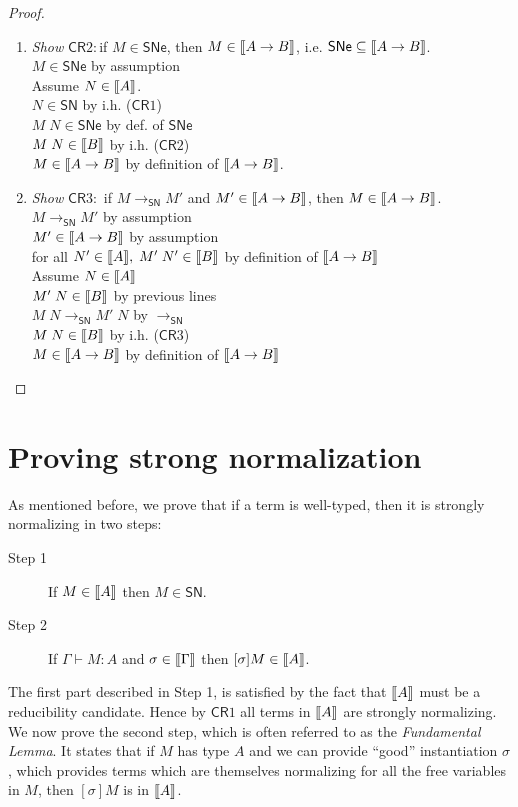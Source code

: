 \documentclass{article}
\newcommand{\SN}{\mathsf{SN}}
\newcommand{\SNe}{\mathsf{SNe}}
\newcommand{\CR}{\mathsf{CR}}
\newcommand{\redSN}{\longrightarrow_\SN}
\def\lv{\mathopen{{[\kern-0.14em[}}}    %
\def\rv{\mathclose{{]\kern-0.14em]}}}   %
\newcommand{\den}[1]{\lv #1 \rv}
\begin{document}
\begin{proof}
\begin{enumerate}
\item \textit{Show} $\CR2:$if $M \in \SNe$, then $M\in \den{A \arrow B}$, i.e. $\SNe \subseteq \den{A \arrow B}$. \\[0.5em]
%
$M \in \SNe$ \hfill by assumption\\
Assume $N \in \den{A}$.  \\
$N \in \SN$ \hfill by i.h. ($\CR1$) \\
$M\;N \in \SNe$ \hfill by def. of $\SNe$ \\
$M\;N \in \den{B}$ \hfill by i.h. ($\CR2$)\\
$M \in \den{A \arrow B}$ \hfill by definition of $\den{A \arrow B}$.
\\[1em]
\item \textit{Show} $\CR3:$ if $M \redSN M'$ and $M' \in \den{A \arrow B}$, then $M \in \den{A \arrow B}$. \\[0.5em]
$M \redSN M'$ \hfill by assumption \\
$M' \in \den{A \arrow B}$ \hfill by assumption  \\
for all $N' \in \den{A}, \;M'\;N' \in \den{B}$ \hfill by definition of $\den{A \arrow B}$ \\
Assume $N \in \den{A}$ \hfill \\
$M' \; N \in \den{B}$ \hfill by previous lines \\
$M\;N \redSN M'\;N$ \hfill by $\redSN$ \\
$M\;N \in \den{B}$ \hfill by i.h. ($\CR3$) \\
$M \in \den{A \arrow B}$ \hfill by definition of $\den{A \arrow B}$
\end{enumerate}
\end{proof}


\section{Proving strong normalization} 
As mentioned before, we prove that if a term is well-typed, then it is strongly normalizing in  two steps:

\begin{description}
\item[Step 1] If $M \in \den{A}$ then $M \in \SN$. 
\item[Step 2] If $\Gamma \vdash M : A$ and $\sigma \in \den{\Gamma}$ then $[\sigma]M \in \den{A}$.
\end{description}

The first part described in Step 1, is satisfied by the fact that $\den{A}$ must be a reducibility candidate. Hence by $\CR 1$ all terms in $\den{A}$ are strongly normalizing. We now prove the second step, which is often referred to as the \emph{Fundamental Lemma}.
It states that if $M$ has type $A$ and we can provide ``good'' instantiation $\sigma$, which provides terms which are themselves normalizing for all the free variables in $M$, then $[\sigma]M$ is in $\den{A}$. 
\end{document}

